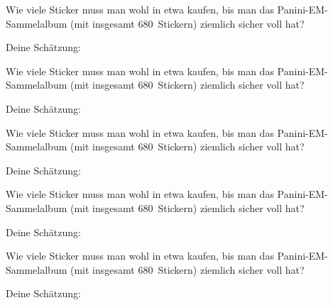 \documentclass{../zirkelblatt1415}
\begin{document}
\sffamily

\newcommand{\zettel}{
  \huge
  Wie viele Sticker muss man wohl in etwa kaufen, bis man das
  Panini-EM-Sammelalbum (mit insgesamt 680~Stickern) ziemlich sicher voll hat?
  \bigskip

  Deine Schätzung: \hrulefill
}

\zettel\vfill
\zettel\vfill
\zettel\vfill
\zettel\vfill
\zettel
\end{document}
